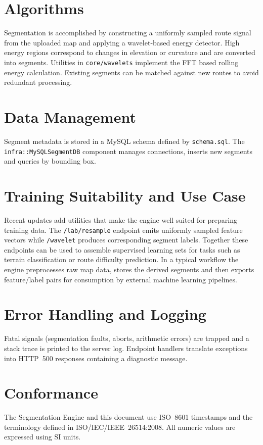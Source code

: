 \documentclass{article}
\begin{document}
\section{Algorithms}
Segmentation is accomplished by constructing a uniformly sampled route signal from the uploaded map and applying a wavelet-based energy detector. High energy regions correspond to changes in elevation or curvature and are converted into segments. Utilities in \texttt{core/wavelets} implement the FFT based rolling energy calculation. Existing segments can be matched against new routes to avoid redundant processing.

\section{Data Management}
Segment metadata is stored in a MySQL schema defined by \texttt{schema.sql}. The \texttt{infra::MySQLSegmentDB} component manages connections, inserts new segments and queries by bounding box.

\section{Training Suitability and Use Case}
Recent updates add utilities that make the engine well suited for preparing training data. The
\texttt{/lab/resample} endpoint emits uniformly sampled feature vectors while \texttt{/wavelet}
produces corresponding segment labels. Together these endpoints can be used to assemble
supervised learning sets for tasks such as terrain classification or route difficulty prediction.
In a typical workflow the engine preprocesses raw map data, stores the derived segments and then
exports feature/label pairs for consumption by external machine learning pipelines.

\section{Error Handling and Logging}
Fatal signals (segmentation faults, aborts, arithmetic errors) are trapped and a stack trace is printed to the server log. Endpoint handlers translate exceptions into HTTP~500 responses containing a diagnostic message.

\section{Conformance}
The Segmentation Engine and this document use ISO~8601 timestamps and the terminology defined in ISO/IEC/IEEE~26514:2008. All numeric values are expressed using SI units.
\end{document}
